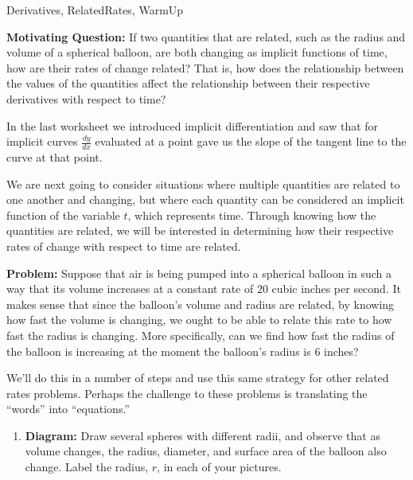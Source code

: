 	
\begin{tagblock}{Derivatives, RelatedRates, WarmUp}
\begin{question}
	

\textbf{Motivating Question:} If two quantities that are related, such as the radius and volume of a spherical balloon, are both changing as implicit functions of time, how are their rates of change related? That is, how does the relationship between the values of the quantities affect the relationship between their respective derivatives with respect to time?

\bigskip

In the last worksheet we introduced implicit differentiation and saw that for implicit curves $\frac{dy}{dx}$ evaluated at a point gave us the slope of the tangent line to the curve at that point.  

\bigskip

We are next going to consider situations where multiple quantities are related to one another and changing, but where each quantity can be considered an implicit function of the variable $t$, which represents time. Through knowing how the quantities are related, we will be interested in determining how their respective rates of change with respect to time are related. 

\bigskip

\textbf{Problem:}  Suppose that air is being pumped into a spherical balloon in such a way that its volume increases at a constant rate of $20$ cubic inches per second. It makes sense that since the balloon's volume and radius are related, by knowing how fast the volume is changing, we ought to be able to relate this rate to how fast the radius is changing. More specifically, can we find how fast the radius of the balloon is increasing at the moment the balloon's radius is 6 inches?

\bigskip
We'll do this in a number of steps and use this same strategy for other related rates problems.  Perhaps the challenge to these problems is translating the ``words'' into ``equations.''

\bigskip

\begin{enumerate}
\item {\bf Diagram: } Draw several spheres with different radii, and observe that as volume changes, the radius, diameter, and surface area of the balloon also change.  Label the radius, $r$, in each of your pictures.  

\vspace{2in}




\end{enumerate}
\end{question}
\end{tagblock}
